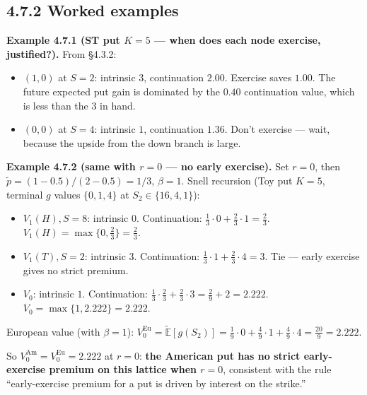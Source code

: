 \documentclass[
  10pt,
  twoside]{book}
\providecommand{\tightlist}{%
  \setlength{\itemsep}{0pt}\setlength{\parskip}{0pt}}
\begin{document}
\subsection{4.7.2 Worked examples}\label{worked-examples-3}

\textbf{Example 4.7.1 (ST put \(K = 5\) --- when does each node
exercise, justified?).} From §4.3.2:

\begin{itemize}
\tightlist
\item
  \((1, 0)\) at \(S = 2\): intrinsic \(3\), continuation \(2.00\).
  Exercise saves \(1.00\). The future expected put gain is dominated by
  the \(0.40\) continuation value, which is less than the \(3\) in hand.
\item
  \((0, 0)\) at \(S = 4\): intrinsic \(1\), continuation \(1.36\). Don't
  exercise --- wait, because the upside from the down branch is large.
\end{itemize}

\textbf{Example 4.7.2 (same with \(r = 0\) --- no early exercise).} Set
\(r = 0\), then \(\tilde p = (1 - 0.5)/(2 - 0.5) = 1/3\), \(\beta = 1\).
Snell recursion (Toy put \(K=5\), terminal \(g\) values \(\{0,1,4\}\) at
\(S_2\in\{16,4,1\}\)):

\begin{itemize}
\tightlist
\item
  \(V_1(H), S = 8\): intrinsic \(0\). Continuation:
  \(\tfrac{1}{3}\cdot 0 + \tfrac{2}{3}\cdot 1 = \tfrac{2}{3}\).
  \(V_1(H) = \max\{0, \tfrac{2}{3}\} = \tfrac{2}{3}\).
\item
  \(V_1(T), S = 2\): intrinsic \(3\). Continuation:
  \(\tfrac{1}{3}\cdot 1 + \tfrac{2}{3}\cdot 4 = 3\). Tie --- early
  exercise gives no strict premium.
\item
  \(V_0\): intrinsic \(1\). Continuation:
  \(\tfrac{1}{3}\cdot \tfrac{2}{3} + \tfrac{2}{3}\cdot 3 = \tfrac{2}{9} + 2 = 2.222\).
  \(V_0 = \max\{1, 2.222\} = 2.222\).
\end{itemize}

European value (with \(\beta=1\)):
\(V_0^{\text{Eu}} = \tilde{\mathbb{E}}[g(S_2)] = \tfrac{1}{9}\cdot 0 + \tfrac{4}{9}\cdot 1 + \tfrac{4}{9}\cdot 4 = \tfrac{20}{9} = 2.222\).

So \(V_0^{\text{Am}} = V_0^{\text{Eu}} = 2.222\) at \(r = 0\):
\textbf{the American put has no strict early-exercise premium on this
lattice when \(r = 0\)}, consistent with the rule ``early-exercise
premium for a put is driven by interest on the strike.''
\end{document}
